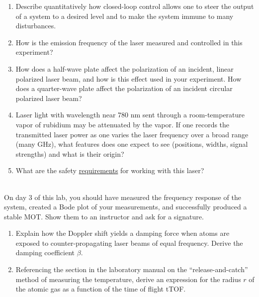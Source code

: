 \documentclass{../signatures}
\begin{document}
\maketitle

\names

\prelab

\begin{enumerate}

    \item Describe quantitatively how closed-loop control allows one to steer the output of a system to a desired level and to make the system immune to many disturbances.
    
    \item How is the emission frequency of the laser measured and controlled in this experiment?

    \item How does a half-wave plate affect the polarization of an incident, linear polarized laser beam, and how is this effect used in your experiment. How does a quarter-wave plate affect the polarization of an incident circular polarized laser beam?

    \item Laser light with wavelength near 780 nm sent through a room-temperature vapor of rubidium may be attenuated by the vapor. If one records the transmitted laser power as one varies the laser frequency over a broad range (many GHz), what features does one expect to see (positions, widths, signal strengths) and what is their origin?

    \item What are the safety \underline{requirements} for working with this laser?
       \\[36pt]
\end{enumerate}

\prelabsignatures

\midlab
\\
On day 3 of this lab, you should have measured the frequency response of the system, created a Bode plot of your measurements, and successfully produced a stable MOT. Show them to an instructor and ask for a signature.

\begin{enumerate}
    \item Explain how the Doppler shift yields a damping force when atoms are exposed to counter-propagating laser beams of equal frequency. Derive the damping coefficient $\beta$.
    
    \item Referencing the section in the laboratory manual on the ``release-and-catch'' method of measuring the temperature, derive an expression for the radius $r$ of the atomic gas as a function of the time of flight tTOF.
\\[36pt]
\end{enumerate}
\end{document}
